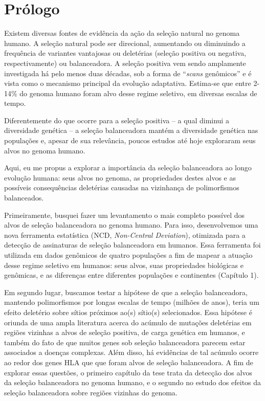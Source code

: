 \pagestyle{fancy}
\fancyhf{}
\fancyfoot[C]{\thepage}
\section{Prólogo}%



Existem diversas fontes de evidência da ação da seleção natural no genoma humano. A seleção natural pode ser direcional, aumentando ou diminuindo a frequência de variantes vantajosas ou deletérias (seleção positiva ou negativa, respectivamente)  ou balanceadora. A seleção positiva vem sendo amplamente investigada há pelo menos duas décadas, sob a forma de \enquote{\emph{scans} genômicos} e é vista como o mecanismo principal da evolução adaptativa. Estima-se que entre 2-14\% do genoma humano foram alvo desse regime seletivo, em diversas escalas de tempo.
%

	Diferentemente do que ocorre para a seleção positiva -- a qual diminui a diversidade genética -- a seleção balanceadora mantém a diversidade genética nas populações e, apesar de sua relevância, poucos estudos até hoje exploraram seus alvos no genoma humano. 
%

	Aqui, eu me propus a explorar a importância da seleção balanceadora ao longo evolução humana: seus alvos no genoma, as propriedades destes alvos e as possíveis consequências deletérias causadas na vizinhança de polimorfismos balanceados.
    
	Primeiramente, busquei fazer um levantamento o mais completo possível dos alvos de seleção balanceadora no genoma humano. Para isso, desenvolvemos uma nova ferramenta estatística (NCD, \emph{Non-Central Deviation}), otimizada para a detecção de assinaturas de seleção balanceadora em humanos. Essa ferramenta foi utilizada em dados genômicos de quatro populações a fim de mapear a atuação desse regime seletivo em humanos: seus alvos, suas propriedades biológicas e genômicas, e as diferenças entre diferentes populações e continentes (Capítulo 1). 
%

	Em segundo lugar, buscamos testar a hipótese de que a seleção balanceadora, mantendo polimorfismos por longas escalas de tempo (milhões de anos), teria um efeito deletério sobre sítios próximos ao(s) sítio(s) selecionados. Essa hipótese é oriunda de uma ampla literatura acerca do acúmulo de mutações deletérias em regiões vizinhas a alvos de seleção positiva, de carga genética em humanos, e também do fato de que muitos genes sob seleção balanceadora parecem estar associados a doenças complexas. Além disso, há evidências de tal acúmulo ocorre ao redor dos genes HLA que que foram alvos de seleção balanceadora.
%
A fim de explorar essas questões, o primeiro capítulo da tese trata da detecção dos alvos da seleção balanceadora no genoma humano, e o segundo no estudo dos efeitos da seleção balanceadora sobre regiões vizinhas do genoma. 


